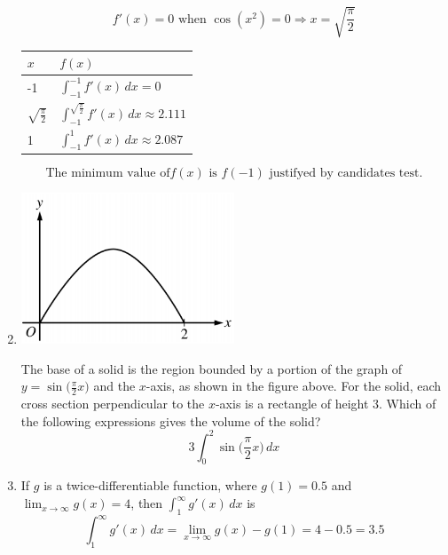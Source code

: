 \documentclass[12pt]{article}
\begin{document}
\begin{enumerate}
    $$f'(x) = 0 \text{ when } \cos(x^2) = 0 \Longrightarrow x = \sqrt{\frac{\pi}{2}}$$
    \begin{table}[h]
        \centering
        \begin{tabular}{l|l}
        $x$ & $f(x)$ \\ \hline 
        -1 & $\int_{-1}^{-1} f'(x) \, dx  = 0$ \\ \hline
        $\sqrt{\frac{\pi}{2}}$ &  $\int_{-1}^{\sqrt{\frac{\pi}{2}}} f'(x) \, dx \approx 2.111$ \\ \hline
        1 & $\int_{-1}^{1} f'(x) \, dx\approx 2.087$ \\ 
        \end{tabular}
        \end{table}

$$\boxed{\text{The minimum value of} f(x) \text{ is } f(-1) \text{ justifyed by candidates test.}}$$
    \item 
        \begin{center}
            \includegraphics[width=2.5in]{FEP5.png}
        \end{center}
    The base of a solid is the region bounded by a portion of the graph of $y=\sin\bigg(\frac{\pi}{2}x\bigg)$ and the $x$-axis, as shown in the figure above. For the solid, each cross section perpendicular to the $x$-axis is a rectangle of height $3$. Which of the following expressions gives the volume of the solid?
    $$\boxed{3\int_{0}^{2}\sin\bigg(\frac{\pi}{2}x\bigg) \, dx }$$

    \item If $g$ is a twice-differentiable function, where $g(1) = 0.5$ and $\lim_{x\to \infty} g(x) =4$, then $\int_{1}^{\infty} g'(x) \, dx$ is
    $$\int_{1}^{\infty} g'(x) \, dx= \lim_{x\to \infty} g(x)  -g(1)= 4-0.5 = \boxed{3.5} $$


\end{enumerate}
\end{document}
